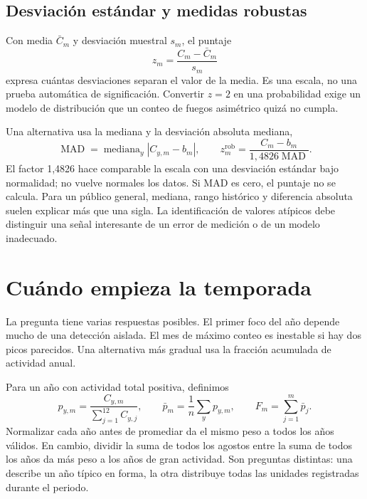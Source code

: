 \subsection{Desviación estándar y medidas robustas}

Con media $\bar C_m$ y desviación muestral $s_m$, el puntaje
\begin{equation}
 z_m=\frac{C_m-\bar C_m}{s_m}
\end{equation}
expresa cuántas desviaciones separan el valor de la media. Es una escala, no una prueba
automática de significación. Convertir $z=2$ en una probabilidad exige un modelo de
distribución que un conteo de fuegos asimétrico quizá no cumpla.

Una alternativa usa la mediana y la desviación absoluta mediana,
\begin{equation}
 \operatorname{MAD}=\operatorname{mediana}_y|C_{y,m}-b_m|,
 \qquad z_m^{\mathrm{rob}}=\frac{C_m-b_m}{1{,}4826\operatorname{MAD}}.
\end{equation}
El factor 1,4826 hace comparable la escala con una desviación estándar bajo normalidad;
no vuelve normales los datos. Si MAD es cero, el puntaje no se calcula. Para un público
general, mediana, rango histórico y diferencia absoluta suelen explicar más que una sigla.
La identificación de valores atípicos debe distinguir una señal interesante de un error
de medición o de un modelo inadecuado.

\FloatBarrier
\section{Cuándo empieza la temporada}

La pregunta tiene varias respuestas posibles. El primer foco del año depende mucho de
una detección aislada. El mes de máximo conteo es inestable si hay dos picos parecidos.
Una alternativa más gradual usa la fracción acumulada de actividad anual.

Para un año con actividad total positiva, definimos
\begin{equation}\label{eq:fraccion-estacional}
 p_{y,m}=\frac{C_{y,m}}{\sum_{j=1}^{12}C_{y,j}},\qquad
 \bar p_m=\frac{1}{n}\sum_y p_{y,m},\qquad
 F_m=\sum_{j=1}^{m}\bar p_j.
\end{equation}
Normalizar cada año antes de promediar da el mismo peso a todos los años válidos. En cambio,
dividir la suma de todos los agostos entre la suma de todos los años da más peso a los años
de gran actividad. Son preguntas distintas: una describe un año típico en forma, la otra
distribuye todas las unidades registradas durante el periodo.


